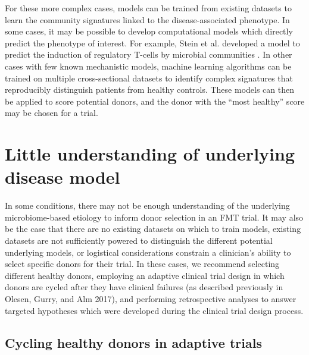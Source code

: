 For these more complex cases, models can be trained from existing datasets to learn the community signatures linked to the disease-associated phenotype. In some cases, it may be possible to develop computational models which directly predict the phenotype of interest.
For example, Stein et al. developed a model to predict the induction of regulatory T-cells by microbial communities \cite{Stein2018}.
In other cases with few known mechanistic models, machine learning algorithms can be trained on multiple cross-sectional datasets to identify complex signatures that reproducibly distinguish patients from healthy controls.
These models can then be applied to score potential donors, and the donor with the “most healthy” score may be chosen for a trial.

\section{Little understanding of underlying disease model}

In some conditions, there may not be enough understanding of the underlying microbiome-based etiology to inform donor selection in an FMT trial. It may also be the case that there are no existing datasets on which to train models, existing datasets are not sufficiently powered to distinguish the different potential underlying models, or logistical considerations constrain a clinician's ability to select specific donors for their trial. In these cases, we recommend selecting different healthy donors, employing an adaptive clinical trial design in which donors are cycled after they have clinical failures (as described previously in Olesen, Gurry, and Alm 2017), and performing retrospective analyses to answer targeted hypotheses which were developed during the clinical trial design process.

\subsection{Cycling healthy donors in adaptive trials}

